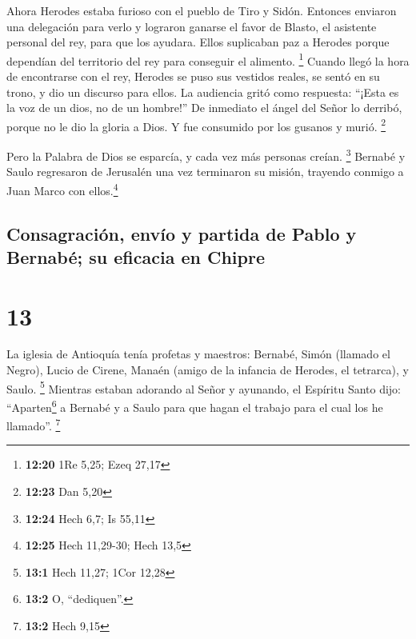  Ahora Herodes estaba furioso con el pueblo de Tiro y
Sidón. Entonces enviaron una delegación para verlo y lograron ganarse el
favor de Blasto, el asistente personal del rey, para que los ayudara.
Ellos suplicaban paz a Herodes porque dependían del territorio del rey
para conseguir el alimento. \footnote{\textbf{12:20} 1Re 5,25; Ezeq
  27,17}  Cuando llegó la hora de encontrarse con el rey,
Herodes se puso sus vestidos reales, se sentó en su trono, y dio un
discurso para ellos.  La audiencia gritó como respuesta:
``¡Esta es la voz de un dios, no de un hombre!''  De
inmediato el ángel del Señor lo derribó, porque no le dio la gloria a
Dios. Y fue consumido por los gusanos y murió. \footnote{\textbf{12:23}
  Dan 5,20}

 Pero la Palabra de Dios se esparcía, y cada vez más
personas creían. \footnote{\textbf{12:24} Hech 6,7; Is 55,11}
 Bernabé y Saulo regresaron de Jerusalén una vez
terminaron su misión, trayendo conmigo a Juan Marco con
ellos.\footnote{\textbf{12:25} Hech 11,29-30; Hech 13,5}

\hypertarget{consagraciuxf3n-envuxedo-y-partida-de-pablo-y-bernabuxe9-su-eficacia-en-chipre}{%
\subsection{Consagración, envío y partida de Pablo y Bernabé; su
eficacia en
Chipre}\label{consagraciuxf3n-envuxedo-y-partida-de-pablo-y-bernabuxe9-su-eficacia-en-chipre}}

\hypertarget{section-12}{%
\section{13}\label{section-12}}

 La iglesia de Antioquía tenía profetas y maestros:
Bernabé, Simón (llamado el Negro), Lucio de Cirene, Manaén (amigo de la
infancia de Herodes, el tetrarca), y Saulo. \footnote{\textbf{13:1} Hech
  11,27; 1Cor 12,28}  Mientras estaban adorando al Señor y
ayunando, el Espíritu Santo dijo: ``Aparten\footnote{\textbf{13:2} O,
  ``dediquen''.} a Bernabé y a Saulo para que hagan el trabajo para el
cual los he llamado''. \footnote{\textbf{13:2} Hech 9,15}

